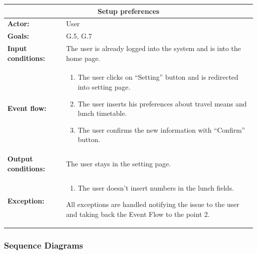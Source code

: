 \begin{tabular} { p{5cm} p{8cm} }
\multicolumn{2}{c}{\textbf{Setup preferences}} \\
\hline
\textbf{Actor:} & User \\ 
\textbf{Goals:} & G.5, G.7 \\ 
\textbf{Input conditions:} & The user is already logged into the system and is into the home page. \\
\textbf{Event flow:} & \begin{enumerate}
				\item
				The user clicks on “Setting” button and is redirected into setting page.
				\item
				The user inserts his preferences about travel means and lunch timetable.
				\item
				The user confirms the new information with “Confirm” button.
			\end{enumerate}\\ 
\textbf{Output conditions:} & The user stays in the setting page.\\ 
\textbf{Exception:} & \begin{enumerate}
				\item
				The user doesn’t insert numbers in the lunch fields.
			\end{enumerate}
All exceptions are handled notifying the issue to the user and taking back the Event Flow to the point 2. \\
\hline
\end{tabular}


\subsubsection{Sequence Diagrams}
